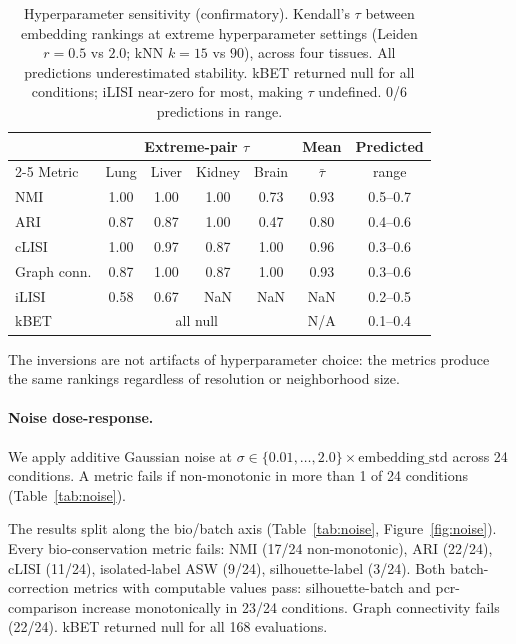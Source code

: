 \documentclass[11pt]{article}
\begin{document}
\begin{table}[t]
\centering
\caption{Hyperparameter sensitivity (confirmatory). Kendall's $\tau$ between embedding rankings at extreme hyperparameter settings (Leiden $r = 0.5$ vs $2.0$; kNN $k = 15$ vs $90$), across four tissues. All predictions underestimated stability. kBET returned null for all conditions; iLISI near-zero for most, making $\tau$ undefined. 0/6 predictions in range.}
\label{tab:hyperparam}
\small
\begin{tabular}{@{}lcccccc@{}}
\toprule
 & \multicolumn{4}{c}{Extreme-pair $\tau$} & Mean & Predicted \\
\cmidrule(lr){2-5}
Metric & Lung & Liver & Kidney & Brain & $\bar{\tau}$ & range \\
\midrule
NMI & 1.00 & 1.00 & 1.00 & 0.73 & 0.93 & 0.5--0.7 \\
ARI & 0.87 & 0.87 & 1.00 & 0.47 & 0.80 & 0.4--0.6 \\
cLISI & 1.00 & 0.97 & 0.87 & 1.00 & 0.96 & 0.3--0.6 \\
Graph conn. & 0.87 & 1.00 & 0.87 & 1.00 & 0.93 & 0.3--0.6 \\
iLISI & 0.58 & 0.67 & NaN & NaN & NaN & 0.2--0.5 \\
kBET & \multicolumn{4}{c}{all null} & N/A & 0.1--0.4 \\
\bottomrule
\end{tabular}
\end{table}

The inversions are not artifacts of hyperparameter choice: the metrics produce the same rankings regardless of resolution or neighborhood size.

\paragraph{Noise dose-response.} We apply additive Gaussian noise at $\sigma \in \{0.01, \ldots, 2.0\} \times \text{embedding\_std}$ across 24 conditions. A metric fails if non-monotonic in more than 1 of 24 conditions (Table~\ref{tab:noise}).

The results split along the bio/batch axis (Table~\ref{tab:noise}, Figure~\ref{fig:noise}). Every bio-conservation metric fails: NMI (17/24 non-monotonic), ARI (22/24), cLISI (11/24), isolated-label ASW (9/24), silhouette-label (3/24). Both batch-correction metrics with computable values pass: silhouette-batch and pcr-comparison increase monotonically in 23/24 conditions. Graph connectivity fails (22/24). kBET returned null for all 168 evaluations.
\end{document}

